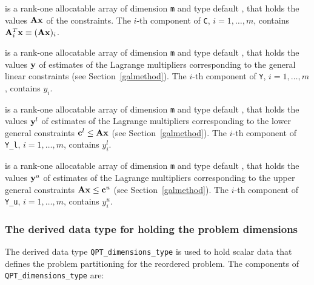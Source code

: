 \documentclass{galahad}
\begin{document}
\begin{description}
 is a rank-one allocatable array of dimension {\tt m} and type default 
\realdp, that holds
the values ${\mathbf{A}} {\mathbf{x}}$ of the constraints.
The $i$-th component of {\tt C}, $i = 1,  \ldots ,  m$, contains 
${\mathbf{A}}_{i}^{T}{\mathbf{x}} \equiv ({\mathbf{A}} {\mathbf{x}})_{i}$.  

 is a rank-one allocatable array of dimension {\tt m} and type 
default \realdp, that holds
the values ${\mathbf{y}}$ of estimates  of the Lagrange multipliers
corresponding to the general linear constraints (see Section~\ref{galmethod}).
The $i$-th component of {\tt Y}, $i = 1,  \ldots ,  m$, contains $y_{i}$.  

 is a rank-one allocatable array of dimension {\tt m} and 
type default \realdp, that holds
the values ${\mathbf{y}}^{l}$ of estimates  of the Lagrange multipliers
corresponding to the lower general constraints ${\mathbf{c}}^{l} \leq {\mathbf{A}} {\mathbf{x}}$
(see Section~\ref{galmethod}).
The $i$-th component of {\tt Y\_l}, $i = 1,  \ldots ,  m$, 
contains $y_{i}^{l}$.  

 is a rank-one allocatable array of dimension {\tt m} and 
type default \realdp, that holds
the values ${\mathbf{y}}^{u}$ of estimates  of the Lagrange multipliers
corresponding to the upper general constraints ${\mathbf{A}} {\mathbf{x}} \leq {\mathbf{c}}^{u}$
(see Section~\ref{galmethod}).
The $i$-th component of {\tt Y\_u}, $i = 1,  \ldots ,  m$, 
contains $y_{i}^{u}$.  

\end{description}



\subsubsection{The derived data type for holding the problem dimensions}
\label{typeprob}
The derived data type 
{\tt QPT\_dimensions\_type} 
is used to hold scalar data that defines the problem partitioning for the
reordered problem. 
The components of 
{\tt QPT\_dimensions\_type} 
are:
\end{document}
